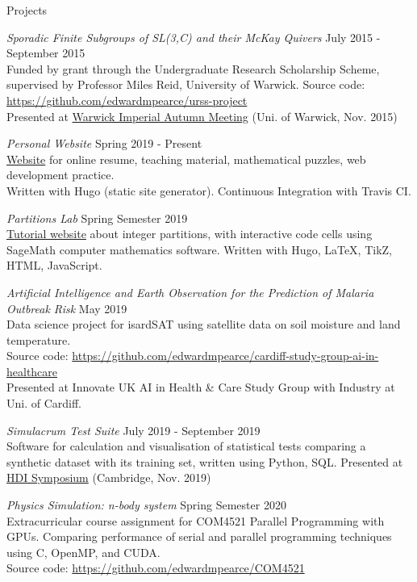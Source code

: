 \documentclass{resume} %
\begin{document}
\begin{rSection}{Projects}

{\em Sporadic Finite Subgroups of SL(3,C) and their McKay Quivers} \hfill July 2015 - September 2015 \\
Funded by grant through the Undergraduate Research Scholarship Scheme, supervised by Professor Miles Reid, University of Warwick. 
Source code: \href{https://github.com/edwardmpearce/urss-project}{https://github.com/edwardmpearce/urss-project} \\
Presented at \href{https://warwick.ac.uk/fac/sci/maths/research/events/2015-16/nonsymposium/wimp/}{Warwick Imperial Autumn Meeting} (Uni. of Warwick, Nov. 2015)

{\em Personal Website} \hfill Spring 2019 - Present \\
\href{https://edwardmpearce.github.io/}{Website} for online resume, teaching material, mathematical puzzles, web development practice.\\
Written with Hugo (static site generator). Continuous Integration with Travis CI.

{\em Partitions Lab} \hfill Spring Semester 2019 \\
\href{https://edwardmpearce.github.io/tutorial-partitions/}{Tutorial website} about integer partitions, with interactive code cells using SageMath computer mathematics software. 
Written with Hugo, LaTeX, TikZ, HTML, JavaScript.

{\em Artificial Intelligence and Earth Observation for the Prediction of Malaria Outbreak Risk} \hfill May 2019 \\
Data science project for isardSAT using satellite data on soil moisture and land temperature. \\
Source code: \href{https://github.com/edwardmpearce/cardiff-study-group-ai-in-healthcare}{https://github.com/edwardmpearce/cardiff-study-group-ai-in-healthcare}\\
Presented at Innovate UK AI in Health \& Care Study Group with Industry at Uni. of Cardiff.

{\em Simulacrum Test Suite} \hfill July 2019 - September 2019 \\
Software for calculation and visualisation of statistical tests comparing a synthetic dataset with its training set, written using Python, SQL.
Presented at \href{https://healthdatainsight.org.uk/hdi-symposium-2019/}{HDI Symposium} (Cambridge, Nov. 2019)

{\em Physics Simulation: n-body system} \hfill Spring Semester 2020 \\
Extracurricular course assignment for COM4521 Parallel Programming with GPUs. Comparing performance of serial and parallel programming techniques using C, OpenMP, and CUDA.\\
Source code: \href{https://github.com/edwardmpearce/COM4521}{https://github.com/edwardmpearce/COM4521}


\end{rSection}
\end{document}
